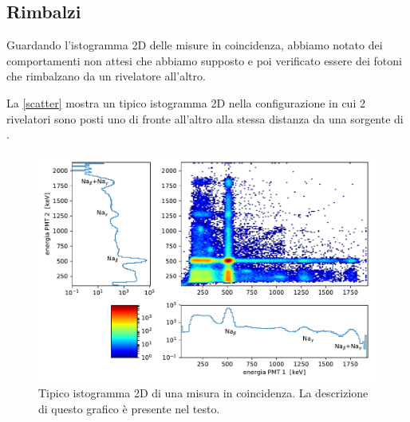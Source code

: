 \subsection{Rimbalzi}

Guardando l'istogramma 2D delle misure in coincidenza, abbiamo notato dei comportamenti non attesi che abbiamo supposto e poi verificato essere dei fotoni che rimbalzano da un rivelatore all'altro.

La \autoref{scatter} mostra un tipico istogramma 2D
nella configurazione in cui 2 rivelatori sono posti uno di fronte all'altro alla stessa distanza da una sorgente di \na{}.

\begin{figure}[h]
\centering
\includegraphics[width=\textwidth]{immagini/esempio}
\caption{Tipico istogramma 2D di una misura in coincidenza. La descrizione di questo grafico è presente nel testo.}
\label{scatter}
\end{figure}

